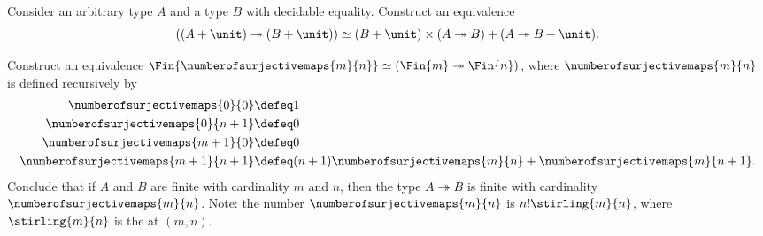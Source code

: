 \begin{exercises}
  \begin{subexenum}
  \item Consider an arbitrary type $A$ and a type $B$ with decidable equality. Construct an equivalence
    \begin{equation*}
      ((A+\unit)\twoheadrightarrow(B+\unit))\simeq (B+\unit)\times(A\twoheadrightarrow B)+(A\twoheadrightarrow B+\unit).
    \end{equation*}
  \item Construct an equivalence $\Fin{\numberofsurjectivemaps{m}{n}}\simeq(\Fin{m}\twoheadrightarrow\Fin{n})$, where $\numberofsurjectivemaps{m}{n}$ is defined recursively by
    \begin{align*}
      \numberofsurjectivemaps{0}{0} & \defeq 1 \\*
      \numberofsurjectivemaps{0}{n+1} & \defeq 0 \\*
      \numberofsurjectivemaps{m+1}{0} & \defeq 0 \\*
      \numberofsurjectivemaps{m+1}{n+1} & \defeq (n+1)\numberofsurjectivemaps{m}{n}+\numberofsurjectivemaps{m}{n+1}.
    \end{align*}
    Conclude that if $A$ and $B$ are finite with cardinality $m$ and $n$, then the type $A\twoheadrightarrow B$ is finite with cardinality $\numberofsurjectivemaps{m}{n}$. Note: the number $\numberofsurjectivemaps{m}{n}$ is $n!\stirling{m}{n}$, where $\stirling{m}{n}$ is the  at $(m,n)$.
  \end{subexenum}
\end{exercises}
